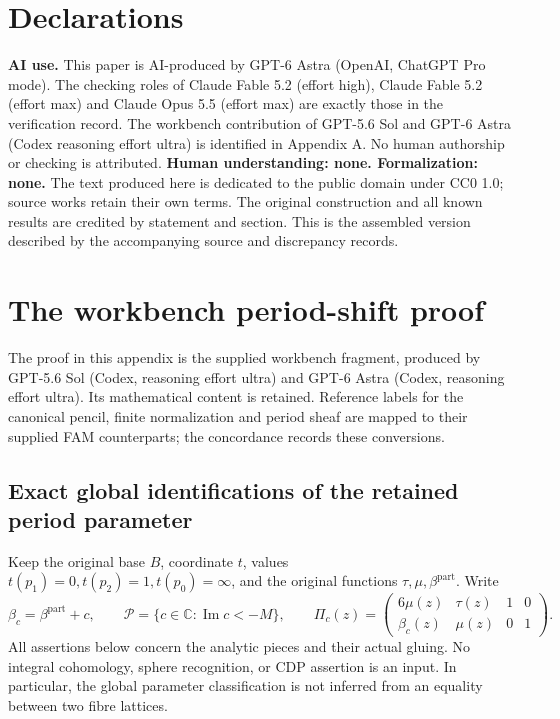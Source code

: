 \documentclass[11pt,a4paper]{article}
\theoremstyle{plain}
\theoremstyle{definition}
\begin{document}
\section*{Declarations}
\textbf{AI use.} This paper is AI-produced by GPT-6 Astra (OpenAI, ChatGPT Pro mode). The checking roles of Claude Fable 5.2 (effort high), Claude Fable 5.2 (effort max) and Claude Opus 5.5 (effort max) are exactly those in the verification record. The workbench contribution of GPT-5.6 Sol and GPT-6 Astra (Codex reasoning effort ultra) is identified in Appendix A. No human authorship or checking is attributed. \textbf{Human understanding: none. Formalization: none.} The text produced here is dedicated to the public domain under CC0 1.0; source works retain their own terms. The original construction and all known results are credited by statement and section. This is the assembled version described by the accompanying source and discrepancy records.


\appendix
\section{The workbench period-shift proof}\label{app:workbench}

The proof in this appendix is the supplied workbench fragment, produced by GPT-5.6 Sol (Codex, reasoning effort ultra) and GPT-6 Astra (Codex, reasoning effort ultra). Its mathematical content is retained. Reference labels for the canonical pencil, finite normalization and period sheaf are mapped to their supplied FAM counterparts; the concordance records these conversions.
\subsection{Exact global identifications of the retained period parameter}
\label{pshift:sec:classification}

Keep the original base $B$, coordinate $t$, values
$t(p_1)=0,t(p_2)=1,t(p_0)=\infty$, and the original functions
$\tau,\mu,\beta^{\mathrm{part}}$. Write
\[
 \beta_c=\beta^{\mathrm{part}}+c,\qquad
 \mathcal P=\{c\in\mathbb C:\operatorname{Im}c<-M\},\qquad
 \Pi_c(z)=\begin{pmatrix}6\mu(z)&\tau(z)&1&0\\
                      \beta_c(z)&\mu(z)&0&1\end{pmatrix}.
 \tag{PS1}\label{pshift:eq:periods}
\]
All assertions below concern the analytic pieces and their actual gluing.
No integral cohomology, sphere recognition, or CDP assertion is an input.
In particular, the global parameter classification is not inferred from
an equality between two fibre lattices.
\end{document}
